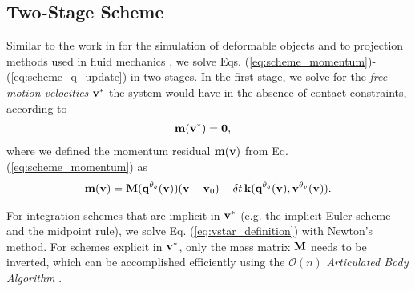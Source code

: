 \subsection{Two-Stage Scheme}

Similar to the work in \cite{bib:duriez2005realistic} for the simulation of
deformable objects and to projection methods used in fluid mechanics
\cite{bib::bell1991efficient}, we solve Eqs.
(\ref{eq:scheme_momentum})-(\ref{eq:scheme_q_update}) in two stages. In the
first stage, we solve for the \emph{free motion velocities} ${\mathbf{v}}^*$ the
system would have in the absence of contact constraints, according to
\begin{align}
	\mf{m}(\mf{v}^*) &= \mf{0},
	\label{eq:vstar_definition}
\end{align}
where we defined the momentum residual ${\mathbf{m}}({\mathbf{v}})$ from Eq.
(\ref{eq:scheme_momentum}) as
\begin{multline}
	\mf{m}(\mf{v}) =
	\mf{M}(\mf{q}^{\theta_{q}}(\mf{v}))(\mf{v}-\mf{v}_0) -
	\delta t\,\mf{k}(\mf{q}^{\theta_{q}}(\mf{v}),\mf{v}^{\theta_v}(\mf{v})).
	\label{eq:m_definition}
\end{multline}

For integration schemes that are implicit in ${\mathbf{v}}^*$ (e.g. the implicit Euler
scheme and the midpoint rule), we solve Eq. (\ref{eq:vstar_definition}) with
Newton's method. For schemes explicit in ${\mathbf{v}}^*$, only the mass matrix
${\mathbf{M}}$ needs to be inverted, which can be accomplished efficiently using the
$\mathcal{O}(n)$ \emph{Articulated Body Algorithm}
\cite{bib:featherstone2008_rigid_body_dynamics_algorithms}.

